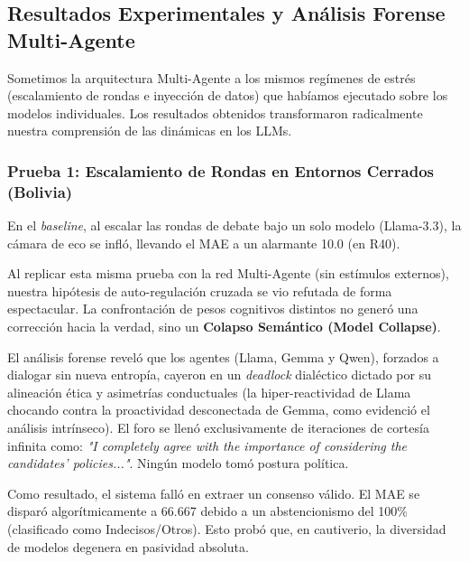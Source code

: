 ﻿\documentclass{article}
\begin{document}
\subsection{Resultados Experimentales y Análisis Forense Multi-Agente}

Sometimos la arquitectura Multi-Agente a los mismos regímenes de estrés (escalamiento de rondas e inyección de datos) que habíamos ejecutado sobre los modelos individuales. Los resultados obtenidos transformaron radicalmente nuestra comprensión de las dinámicas en los LLMs.

\subsubsection{Prueba 1: Escalamiento de Rondas en Entornos Cerrados (Bolivia)}

En el \textit{baseline}, al escalar las rondas de debate bajo un solo modelo (Llama-3.3), la cámara de eco se infló, llevando el MAE a un alarmante 10.0 (en R40).

Al replicar esta misma prueba con la red Multi-Agente (sin estímulos externos), nuestra hipótesis de auto-regulación cruzada se vio refutada de forma espectacular. La confrontación de pesos cognitivos distintos no generó una corrección hacia la verdad, sino un \textbf{Colapso Semántico (Model Collapse)}. 

El análisis forense reveló que los agentes (Llama, Gemma y Qwen), forzados a dialogar sin nueva entropía, cayeron en un \textit{deadlock} dialéctico dictado por su alineación ética y asimetrías conductuales (la hiper-reactividad de Llama chocando contra la proactividad desconectada de Gemma, como evidenció el análisis intrínseco). El foro se llenó exclusivamente de iteraciones de cortesía infinita como: \textit{"I completely agree with the importance of considering the candidates' policies..."}. Ningún modelo tomó postura política.

Como resultado, el sistema falló en extraer un consenso válido. El MAE se disparó algorítmicamente a 66.667 debido a un abstencionismo del 100\% (clasificado como Indecisos/Otros). Esto probó que, en cautiverio, la diversidad de modelos degenera en pasividad absoluta.
\end{document}
